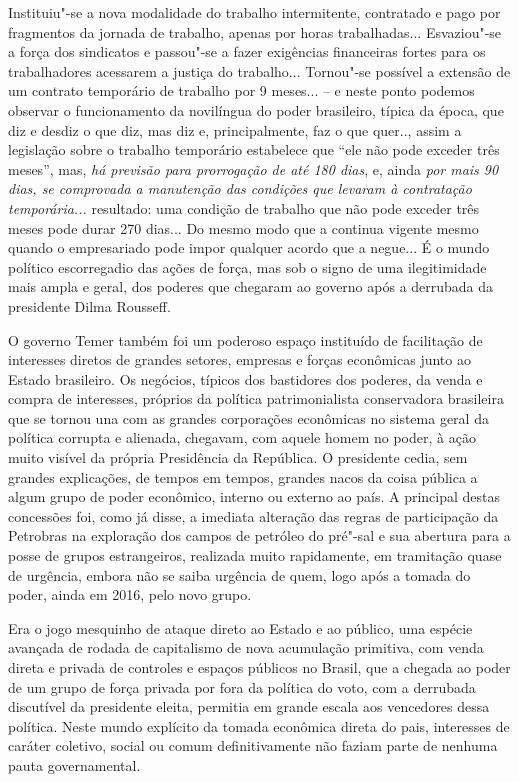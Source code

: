Instituiu"-se a nova modalidade do trabalho intermitente, contratado e
pago por fragmentos da jornada de trabalho, apenas por horas
trabalhadas... Esvaziou"-se a força dos sindicatos e passou"-se a fazer
exigências financeiras fortes para os trabalhadores acessarem a justiça
do trabalho... Tornou"-se possível a extensão de um contrato temporário
de trabalho por 9 meses... -- e neste ponto podemos observar o
funcionamento da novilíngua do poder brasileiro, típica da época, que
diz e desdiz o que diz, mas diz e, principalmente, faz o que quer..,
assim a legislação sobre o trabalho temporário estabelece que ``ele não
pode exceder três meses'', mas, \emph{há previsão para prorrogação de
até 180 dias}, e, ainda \emph{por mais 90 dias, se comprovada a
manutenção das condições que levaram à contratação temporária...}
resultado: uma condição de trabalho que não pode exceder três meses pode
durar 270 dias... Do mesmo modo que a  continua vigente mesmo quando
o empresariado pode impor qualquer acordo que a negue... É o mundo
político escorregadio das ações de força, mas sob o signo de uma
ilegitimidade mais ampla e geral, dos poderes que chegaram ao governo
após a derrubada da presidente Dilma Rousseff.

O governo Temer também foi um poderoso espaço instituído de facilitação
de interesses diretos de grandes setores, empresas e forças econômicas
junto ao Estado brasileiro. Os negócios, típicos dos bastidores dos
poderes, da venda e compra de interesses, próprios da política
patrimonialista conservadora brasileira que se tornou una com as grandes
corporações econômicas no sistema geral da política corrupta e alienada,
chegavam, com aquele homem no poder, à ação muito visível da própria
Presidência da República. O presidente cedia, sem grandes explicações,
de tempos em tempos, grandes nacos da coisa pública a algum grupo de
poder econômico, interno ou externo ao país. A principal destas
concessões foi, como já disse, a imediata alteração das regras de
participação da Petrobras na exploração dos campos de petróleo do
pré"-sal e sua abertura para a posse de grupos estrangeiros, realizada
muito rapidamente, em tramitação quase de urgência, embora não se saiba
urgência de quem, logo após a tomada do poder, ainda em 2016, pelo novo
grupo.

Era o jogo mesquinho de ataque direto ao Estado e ao público, uma
espécie avançada de rodada de capitalismo de nova acumulação primitiva,
com venda direta e privada de controles e espaços públicos no Brasil,
que a chegada ao poder de um grupo de força privada por fora da política
do voto, com a derrubada discutível da presidente eleita, permitia em
grande escala aos vencedores dessa política. Neste mundo explícito da
tomada econômica direta do pais, interesses de caráter coletivo,
social ou comum definitivamente não faziam parte de nenhuma pauta
governamental.

